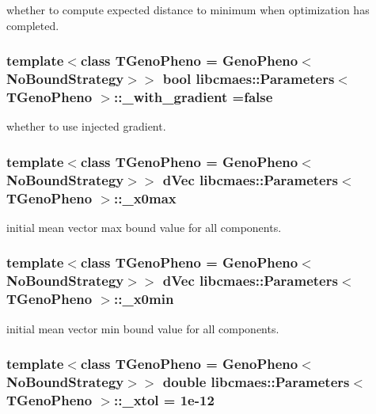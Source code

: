 whether to compute expected distance to minimum when optimization has completed. \hypertarget{classlibcmaes_1_1Parameters_aff76cebbfef51c20398aab8f49a3676a}{
\subsubsection[{\-\_\-with\-\_\-gradient}]{\setlength{\rightskip}{0pt plus 5cm}template$<$class T\-Geno\-Pheno = Geno\-Pheno$<$\-No\-Bound\-Strategy$>$$>$ bool {\bf libcmaes\-::\-Parameters}$<$ T\-Geno\-Pheno $>$\-::\-\_\-with\-\_\-gradient =false\hspace{0.3cm}{\ttfamily [protected]}}}\label{classlibcmaes_1_1Parameters_aff76cebbfef51c20398aab8f49a3676a}
whether to use injected gradient. \hypertarget{classlibcmaes_1_1Parameters_aece9694af9bee78bb13b0994db7ac45e}{
\subsubsection[{\-\_\-x0max}]{\setlength{\rightskip}{0pt plus 5cm}template$<$class T\-Geno\-Pheno = Geno\-Pheno$<$\-No\-Bound\-Strategy$>$$>$ d\-Vec {\bf libcmaes\-::\-Parameters}$<$ T\-Geno\-Pheno $>$\-::\-\_\-x0max\hspace{0.3cm}{\ttfamily [protected]}}}\label{classlibcmaes_1_1Parameters_aece9694af9bee78bb13b0994db7ac45e}
initial mean vector max bound value for all components. \hypertarget{classlibcmaes_1_1Parameters_aa3bb27467698d9cb7fc7e0a83b48800f}{
\subsubsection[{\-\_\-x0min}]{\setlength{\rightskip}{0pt plus 5cm}template$<$class T\-Geno\-Pheno = Geno\-Pheno$<$\-No\-Bound\-Strategy$>$$>$ d\-Vec {\bf libcmaes\-::\-Parameters}$<$ T\-Geno\-Pheno $>$\-::\-\_\-x0min\hspace{0.3cm}{\ttfamily [protected]}}}\label{classlibcmaes_1_1Parameters_aa3bb27467698d9cb7fc7e0a83b48800f}
initial mean vector min bound value for all components. \hypertarget{classlibcmaes_1_1Parameters_aaa9e8eedba7d7140d116163b40f653f8}{
\subsubsection[{\-\_\-xtol}]{\setlength{\rightskip}{0pt plus 5cm}template$<$class T\-Geno\-Pheno = Geno\-Pheno$<$\-No\-Bound\-Strategy$>$$>$ double {\bf libcmaes\-::\-Parameters}$<$ T\-Geno\-Pheno $>$\-::\-\_\-xtol = 1e-\/12\hspace{0.3cm}{\ttfamily [protected]}}}\label{classlibcmaes_1_1Parameters_aaa9e8eedba7d7140d116163b40f653f8}
